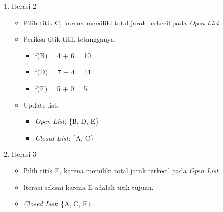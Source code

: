 \begin{enumerate}
    \item Iterasi 2
    \begin{itemize}
        \item Pilih titik C, karena memiliki total jarak terkecil pada \textit{Open List}
        \item Periksa titik-titik tetangganya.
        \begin{itemize}
            \item f(B) = 4 + 6 = 10
            \item f(D) = 7 + 4 = 11
            \item f(E) = 5 + 0 = 5
        \end{itemize}
        \item Update list.
        \begin{itemize}
            \item \textit{Open List}: \{B, D, E\}
            \item \textit{Closed List}: \{A, C\}
        \end{itemize}
    \end{itemize}

    \item Iterasi 3
    \begin{itemize}
        \item Pilih titik E, karena memiliki total jarak terkecil pada \textit{Open List}
        \item Iterasi selesai karena E adalah titik tujuan.
        \item \textit{Closed List}: \{A, C, E\}
    \end{itemize}
    
\end{enumerate}